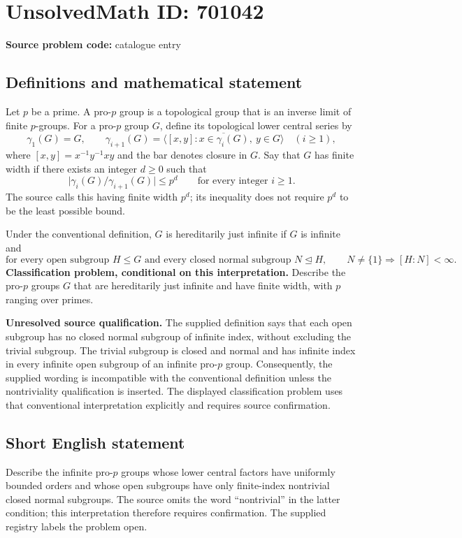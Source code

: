 \documentclass[11pt]{article}
\begin{document}
\section*{UnsolvedMath ID: 701042}
\textbf{Source problem code:} catalogue entry
\subsection{Definitions and mathematical statement}
Let \(p\) be a prime. A pro-\(p\) group is a topological group that is an inverse limit of finite \(p\)-groups. For a pro-\(p\) group \(G\), define its topological lower central series by
\[
\gamma_1(G)=G,\qquad
\gamma_{i+1}(G)=\overline{\langle [x,y]:x\in\gamma_i(G),\ y\in G\rangle}\quad(i\geq 1),
\]
where \([x,y]=x^{-1}y^{-1}xy\) and the bar denotes closure in \(G\). Say that \(G\) has finite width if there exists an integer \(d\geq 0\) such that
\[
\lvert\gamma_i(G)/\gamma_{i+1}(G)\rvert\leq p^d
\qquad\text{for every integer }i\geq 1.
\]
The source calls this having finite width \(p^d\); its inequality does not require \(p^d\) to be the least possible bound.

Under the conventional definition, \(G\) is hereditarily just infinite if \(G\) is infinite and
\[
\text{for every open subgroup }H\leq G\text{ and every closed normal subgroup }N\trianglelefteq H,
\qquad N\neq\{1\}\Longrightarrow [H:N]<\infty.
\]
\textbf{Classification problem, conditional on this interpretation.} Describe the pro-\(p\) groups \(G\) that are hereditarily just infinite and have finite width, with \(p\) ranging over primes.

\textbf{Unresolved source qualification.} The supplied definition says that each open subgroup has no closed normal subgroup of infinite index, without excluding the trivial subgroup. The trivial subgroup is closed and normal and has infinite index in every infinite open subgroup of an infinite pro-\(p\) group. Consequently, the supplied wording is incompatible with the conventional definition unless the nontriviality qualification is inserted. The displayed classification problem uses that conventional interpretation explicitly and requires source confirmation.
\subsection{Short English statement}
Describe the infinite pro-\(p\) groups whose lower central factors have uniformly bounded orders and whose open subgroups have only finite-index nontrivial closed normal subgroups. The source omits the word ``nontrivial'' in the latter condition; this interpretation therefore requires confirmation. The supplied registry labels the problem open.
\end{document}

